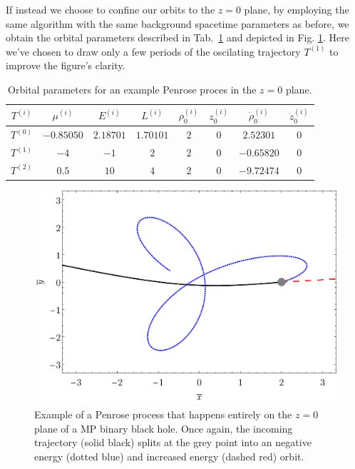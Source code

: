 If instead we choose to confine our orbits to the $z=0$ plane, by employing the same algorithm with the same background spacetime parameters as before, we obtain the orbital parameters described in Tab.~\ref{ch:penrose_binaries/tab:exemple_orbital_parameters_2} and depicted in Fig. \ref{ch:penrose_binaries/fig:penrose_example_2}. Here we've chosen to draw only a few periods of the oscilating trajectory $T^{(1)}$ to improve the figure's clarity.

\begin{table}[!htbp]
  \centering
  \caption{Orbital parameters for an example Penrose proces in the $z=0$ plane.}
  \begin{tabular}{c|c|c|c|c|c|c|c|}
    \cline{1-8}
    \multicolumn{1}{|c|}{$T^{(i)}$} & $\mu^{(i)}$ & $E^{(i)}$ & $L^{(i)}$ & $\rho_0^{(i)}$ & $z_0^{(i)}$ & $\dot{\rho}_0^{(i)}$ & $\dot{z}_0^{(i)}$ \\ \hline
    \multicolumn{1}{|c|}{$T^{(0)}$} & $-0.85050$  & $2.18701$ & $1.70101$ & $2$            & $0$         & $2.52301$            & $0$               \\ \hline
    \multicolumn{1}{|c|}{$T^{(1)}$} & $-4$        & $-1$      & $2$       & $2$            & $0$         & $-0.65820$           & $0$               \\ \hline
    \multicolumn{1}{|c|}{$T^{(2)}$} & $0.5$       & $10$      & $4$       & $2$            & $0$         & $-9.72474$           & $0$               \\ \hline
  \end{tabular}
  \label{ch:penrose_binaries/tab:exemple_orbital_parameters_2}
\end{table}

\begin{figure}[!htbp]
  \centering
  \includegraphics[scale = 0.43]{img/penrose_binaries/mp/penrose_xy.pdf}
  \caption{Example of a Penrose process that happens entirely on the $z=0$ plane of a MP binary black hole. Once again, the incoming trajectory (solid black) splits at the grey point into an negative energy (dotted blue) and increased energy (dashed red) orbit.}
  \label{ch:penrose_binaries/fig:penrose_example_2}
\end{figure}

